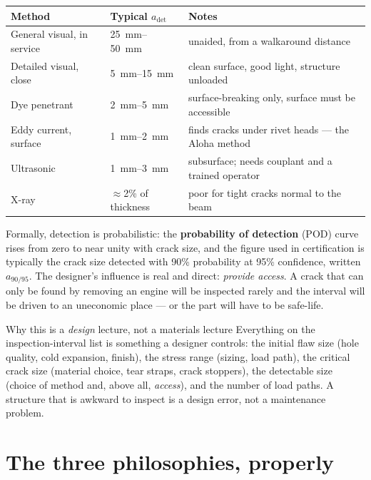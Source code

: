 \documentclass[11pt,a4paper]{article}
\begin{document}
\begin{center}\small
\begin{tabular}{@{}llp{6.6cm}@{}}
\toprule
Method & Typical $a_{\mathrm{det}}$ & Notes \\
\midrule
General visual, in service & \SIrange{25}{50}{mm} & unaided, from a walkaround distance \\
Detailed visual, close & \SIrange{5}{15}{mm} & clean surface, good light, structure unloaded \\
Dye penetrant & \SIrange{2}{5}{mm} & surface-breaking only, surface must be accessible \\
Eddy current, surface & \SIrange{1}{2}{mm} & finds cracks under rivet heads --- the Aloha method \\
Ultrasonic & \SIrange{1}{3}{mm} & subsurface; needs couplant and a trained operator \\
X-ray & $\approx$2\% of thickness & poor for tight cracks normal to the beam \\
\bottomrule
\end{tabular}
\end{center}

Formally, detection is probabilistic: the \textbf{probability of detection} (POD) curve rises from zero to near unity with crack size, and the figure used in certification is typically the crack size detected with 90\% probability at 95\% confidence, written $a_{90/95}$. The designer's influence is real and direct: \emph{provide access}. A crack that can only be found by removing an engine will be inspected rarely and the interval will be driven to an uneconomic place --- or the part will have to be safe-life.

\begin{aerobox}{Why this is a \emph{design} lecture, not a materials lecture}
Everything on the inspection-interval list is something a designer controls: the initial flaw size (hole quality, cold expansion, finish), the stress range (sizing, load path), the critical crack size (material choice, tear straps, crack stoppers), the detectable size (choice of method and, above all, \emph{access}), and the number of load paths. A structure that is awkward to inspect is a design error, not a maintenance problem.
\end{aerobox}

\section{The three philosophies, properly}
\end{document}
